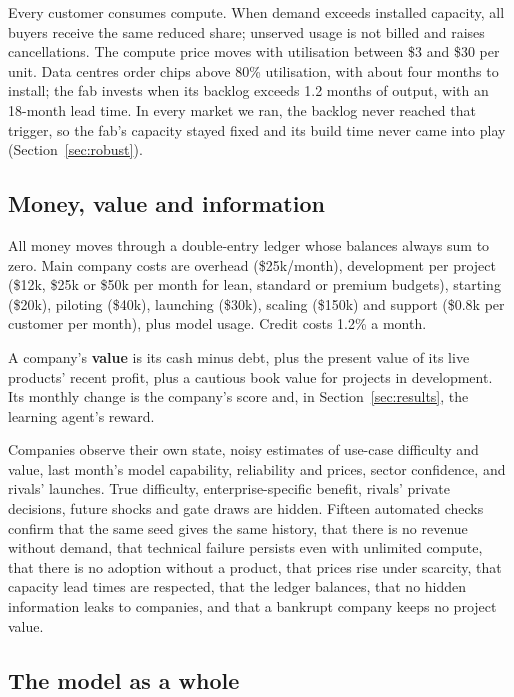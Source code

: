 \documentclass[11pt]{article}
\begin{document}
Every customer consumes compute. When demand exceeds installed capacity, all buyers receive the same reduced share; unserved usage is not billed and raises cancellations. The compute price moves with utilisation between \$3 and \$30 per unit. Data centres order chips above 80\% utilisation, with about four months to install; the fab invests when its backlog exceeds 1.2 months of output, with an 18-month lead time. In every market we ran, the backlog never reached that trigger, so the fab's capacity stayed fixed and its build time never came into play (Section~\ref{sec:robust}).

\subsection{Money, value and information}
All money moves through a double-entry ledger whose balances always sum to zero. Main company costs are overhead (\$25k/month), development per project (\$12k, \$25k or \$50k per month for lean, standard or premium budgets), starting (\$20k), piloting (\$40k), launching (\$30k), scaling (\$150k) and support (\$0.8k per customer per month), plus model usage. Credit costs 1.2\% a month.

A company's \textbf{value} is its cash minus debt, plus the present value of its live products' recent profit, plus a cautious book value for projects in development. Its monthly change is the company's score and, in Section~\ref{sec:results}, the learning agent's reward.

Companies observe their own state, noisy estimates of use-case difficulty and value, last month's model capability, reliability and prices, sector confidence, and rivals' launches. True difficulty, enterprise-specific benefit, rivals' private decisions, future shocks and gate draws are hidden. Fifteen automated checks confirm that the same seed gives the same history, that there is no revenue without demand, that technical failure persists even with unlimited compute, that there is no adoption without a product, that prices rise under scarcity, that capacity lead times are respected, that the ledger balances, that no hidden information leaks to companies, and that a bankrupt company keeps no project value.

\subsection{The model as a whole}
\label{sec:formal}
\end{document}
